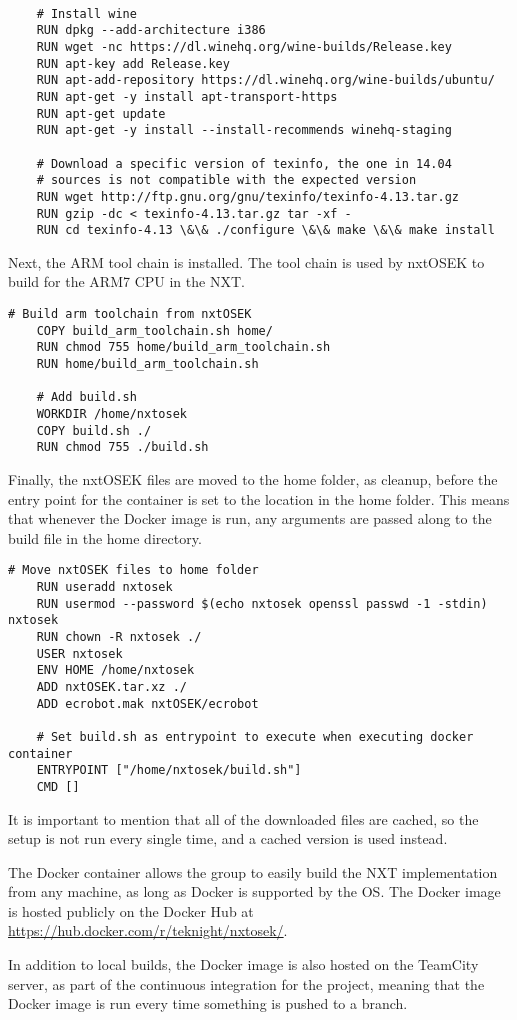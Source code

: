 \begin{lstlisting}[language=docker,label={lst:dockerimplementation2},caption={Installation of Wine and texinfo}]

    # Install wine
    RUN dpkg --add-architecture i386
    RUN wget -nc https://dl.winehq.org/wine-builds/Release.key
    RUN apt-key add Release.key
    RUN apt-add-repository https://dl.winehq.org/wine-builds/ubuntu/
    RUN apt-get -y install apt-transport-https
    RUN apt-get update
    RUN apt-get -y install --install-recommends winehq-staging
    
    # Download a specific version of texinfo, the one in 14.04 
    # sources is not compatible with the expected version
    RUN wget http://ftp.gnu.org/gnu/texinfo/texinfo-4.13.tar.gz
    RUN gzip -dc < texinfo-4.13.tar.gz tar -xf -
    RUN cd texinfo-4.13 \&\& ./configure \&\& make \&\& make install
\end{lstlisting} 
Next, the ARM tool chain is installed.
The tool chain is used by nxtOSEK to build for the ARM7 CPU in the NXT.
\begin{lstlisting}[language=docker,label={lst:dockerimplementation3},caption={Building the ARM toolchain}]
    # Build arm toolchain from nxtOSEK
    COPY build_arm_toolchain.sh home/
    RUN chmod 755 home/build_arm_toolchain.sh
    RUN home/build_arm_toolchain.sh
    
    # Add build.sh
    WORKDIR /home/nxtosek
    COPY build.sh ./
    RUN chmod 755 ./build.sh
\end{lstlisting}

Finally, the nxtOSEK files are moved to the home folder, as cleanup, before the entry point for the container is set to the location in the home folder.
This means that whenever the Docker image is run, any arguments are passed along to the build file in the home directory.

\begin{lstlisting}[language=docker,label={lst:dockerimplementation4},caption={Moving the nxtOSEK files and setting the entrypoint}]   
    # Move nxtOSEK files to home folder
    RUN useradd nxtosek
    RUN usermod --password $(echo nxtosek openssl passwd -1 -stdin) nxtosek
    RUN chown -R nxtosek ./
    USER nxtosek
    ENV HOME /home/nxtosek
    ADD nxtOSEK.tar.xz ./
    ADD ecrobot.mak nxtOSEK/ecrobot
    
    # Set build.sh as entrypoint to execute when executing docker container
    ENTRYPOINT ["/home/nxtosek/build.sh"]
    CMD []    
\end{lstlisting}
It is important to mention that all of the downloaded files are cached, so the setup is not run every single time, and a cached version is used instead.

The Docker container allows the group to easily build the NXT implementation from any machine, as long as Docker is supported by the OS.
The Docker image is hosted publicly on the Docker Hub at \url{https://hub.docker.com/r/teknight/nxtosek/}.

In addition to local builds, the Docker image is also hosted on the TeamCity server, as part of the continuous integration for the project, meaning that the Docker image is run every time something is pushed to a branch.


